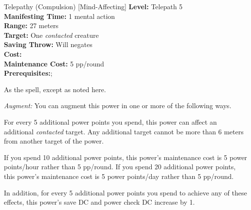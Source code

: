 {Telepathy (Compulsion) [Mind-Affecting]}
{
	\textbf{Level:}
	Telepath 5\\
	\textbf{Manifesting Time:}
	1 mental action\\
	\textbf{Range:}
	27 meters\\
	\textbf{Target:}
	One \emph{contacted} creature\\
	\textbf{Saving Throw:}
	Will negates\\
	\textbf{Cost:}
	\\
	\textbf{Maintenance Cost:}
	5 pp/round\\
	\textbf{Prerequisites:};
	\\
}
{
	As the  spell, except as noted here.

	\textit{Augment:} You can augment this power in one or more of the following ways.
	\begin{itemize*}
	\item For every 5 additional power points you spend, this power can affect an additional \emph{contacted} target. Any additional target cannot be more than 6 meters from another target of the power.
	\item If you spend 10 additional power points, this power's maintenance cost is 5 power points/hour rather than 5 pp/round. If you spend 20 additional power points, this power's maintenance cost is 5 power points/day rather than 5 pp/round.
	\item In addition, for every 5 additional power points you spend to achieve any of these effects, this power's save DC and power check DC increase by 1.
	\end{itemize*}
}